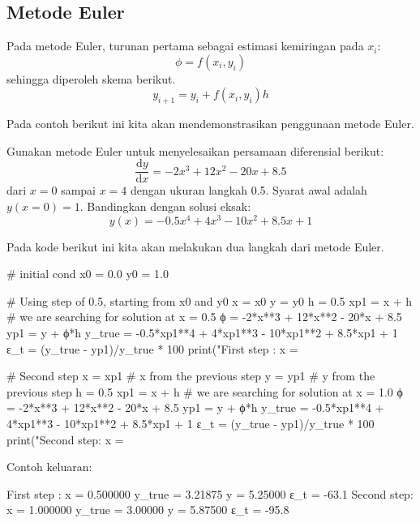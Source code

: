\subsection{Metode Euler}

Pada metode Euler, turunan pertama sebagai estimasi kemiringan pada
$x_i$:
\begin{equation*}
\phi = f(x_i, y_i)
\end{equation*}
sehingga diperoleh skema berikut.
\begin{equation}
y_{i+1} = y_{i} + f(x_i, y_i) h
\label{eq:euler_1step}
\end{equation}

Pada contoh berikut ini kita akan mendemonstrasikan penggunaan metode Euler.

\begin{soal}
Gunakan metode Euler untuk menyelesaikan persamaan diferensial berikut:
\begin{equation*}
\frac{\mathrm{d}y}{\mathrm{d}x} = -2x^3 + 12x^2 - 20x + 8.5
\end{equation*}
dari $x=0$ sampai $x=4$ dengan ukuran langkah 0.5.
Syarat awal adalah $y(x=0) = 1$.
Bandingkan dengan solusi eksak:
\begin{equation*}
y(x) = -0.5x^4 + 4x^3 - 10x^2 + 8.5x + 1
\end{equation*}
\end{soal}

Pada kode berikut ini kita akan melakukan dua langkah dari metode Euler.
\begin{pythoncode}
# initial cond
x0 = 0.0
y0 = 1.0

# Using step of 0.5, starting from x0 and y0
x = x0
y = y0
h = 0.5
xp1 = x + h # we are searching for solution at x = 0.5
ϕ = -2*x**3 + 12*x**2 - 20*x + 8.5
yp1 = y + ϕ*h
y_true = -0.5*xp1**4 + 4*xp1**3 - 10*xp1**2 + 8.5*xp1 + 1
ε_t = (y_true - yp1)/y_true * 100
print("First step : x = %

# Second step
x = xp1 # x from the previous step
y = yp1 # y from the previous step
h = 0.5
xp1 = x + h # we are searching for solution at x = 1.0
ϕ = -2*x**3 + 12*x**2 - 20*x + 8.5
yp1 = y + ϕ*h
y_true = -0.5*xp1**4 + 4*xp1**3 - 10*xp1**2 + 8.5*xp1 + 1
ε_t = (y_true - yp1)/y_true * 100
print("Second step: x = %
\end{pythoncode}

Contoh keluaran:
\begin{textcode}
First step : x = 0.500000 y_true = 3.21875 y = 5.25000 ε_t = -63.1 %
Second step: x = 1.000000 y_true = 3.00000 y = 5.87500 ε_t = -95.8 %
\end{textcode}

